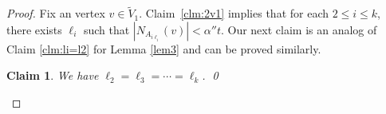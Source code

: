 \documentclass[reqno]{amsart}
\theoremstyle{plain}
\newtheorem{claim}[theorem]{Claim}
\def\a{\alpha}
\begin{document}
\begin{proof}

Fix an vertex $v\in \tilde V_1$. Claim~\ref{clm:2v1} implies that for each $2\le i\le k$, there exists $\ell_i$ such that $|N_{A_{i \ell_i}}(v)| < \a'' t$. Our next claim is an analog of Claim \ref{clm:li=l2} for Lemma \ref{lem3} and can be proved similarly.

\begin{claim}\label{clm:2li=l2}
We have $\ell_2 = \ell_3 = \cdots = \ell_k$. \qed
\end{claim}





\end{proof}
\end{document}
